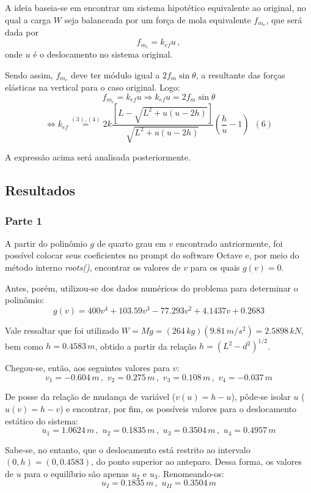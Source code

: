 \documentclass[a4paper, 12pt]{article}
\begin{document}
	A ideia baseia-se em encontrar um sistema hipotético equivalente ao original, no qual a carga $W$ seja balanceada 
	por um força de mola equivalente $f_{m_e}$, que será dada por $$f_{m_e}=k_{ef}u\,,$$ onde $u$ é o deslocamento
	no sistema original.
	
	Sendo assim, $f_{m_e}$ deve ter módulo igual a $2f_m\sin \theta$, a resultante das forças elásticas na vertical 
	para o caso original. Logo: $$f_{m_e}=k_{ef}u \Longrightarrow k_{ef}u=2f_m\sin \theta$$
	$$\Longleftrightarrow k_{ef}\stackrel{(3),(4)}{=}2k\frac{\left[L-\sqrt{L^2+u(u-2h)}\right]}{
	\sqrt{L^2+u(u-2h)}}\left(\frac{h}{u}-1\right)\,\,\,(6)$$ $$ $$
	
	A expressão acima será analisada posteriormente.
	
	\newpage
	
	\subsection{Resultados}
	
	\subsubsection{Parte 1}
	
	A partir do polinômio $g$ de quarto grau em $v$ encontrado antriormente, foi possível colocar seus coeficientes no
	prompt do software Octave e, por meio do método interno \textit{roots()}, encontrar os valores de $v$ para os quais
	$g(v)=0$.
	
	Antes, porém, utilizou-se dos dados numéricos do problema para determinar o polinômio:
	$$g(v)=400v^4+103.59v^3-77.293v^2+4.1437v+0.2683$$
	
	Vale ressaltar que foi utilizado $W=Mg=(264\,kg)(9.81\,m/s^2)=2.5898\,kN$, bem como $h=0.4583\,m$, obtido a partir
	da relação $h=(L^2-d^2)^{1/2}$.
	
	Chegou-se, então, aos seguintes valores para $v$: $$v_1=-0.604\,m\,,\,\,v_2=0.275\,m\,,\,\,v_3=0.108\,m
	\,,\,\,v_4=-0.037\,m$$
	
	De posse da relação de mudança de variável ($v(u)=h-u$), pôde-se isolar $u$ ($u(v)=h-v$) e encontrar, por fim, os 
	possíveis valores para o deslocamento estático do sistema:
	$$u_1=1.0624\,m\,,\,\,u_2=0.1835\,m\,,\,\,u_3=0.3504\,m\,,\,\,u_4=0.4957\,m$$
	
	Sabe-se, no entanto, que o deslocamento está restrito ao intervalo $(0,h)=(0,0.4583)$, do ponto superior ao anteparo.
	Dessa forma, os valores de $u$ para o equilíbrio são apenas $u_2$ e $u_3$. Renomeando-os:
	$$u_I=0.1835\,m\,,\,\,u_{II}=0.3504\,m$$
	
\end{document}
